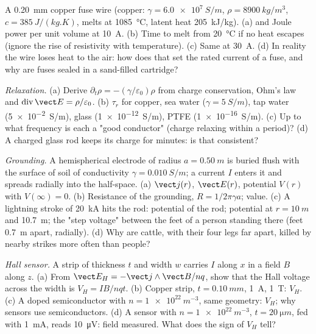 \begin{exercise}[$\star\star$]\label{exo:b2:charges-currents-conduction:8}
A \qty{0.20}{mm} copper fuse wire (copper: $\gamma = \qty{6.0e7}{S/m}$, $\rho =
\qty{8900}{kg/m^3}$, $c = \qty{385}{J/(kg.K)}$, melts at \qty{1085}{\degreeCelsius},
latent heat \qty{205}{kJ/kg}). (a)  and Joule power per
unit volume at \qty{10}{A}. (b) Time to melt from \qty{20}{\degreeCelsius} if no
heat escapes (ignore the rise of resistivity with temperature). (c)
Same at \qty{30}{A}. (d) In reality the wire loses heat to the air: how does
that set the rated current of a fuse, and why are fuses sealed in a
sand-filled cartridge?
\end{exercise}

\begin{exercise}[$\star\star$]\label{exo:b2:charges-currents-conduction:9}
\emph{Relaxation.} (a) Derive $\partial_t\rho = -(\gamma/\varepsilon_0)\rho$ from charge
conservation, Ohm's law and $\operatorname{div}\vect E = \rho/\varepsilon_0$. (b)
$\tau_r$ for copper, sea water ($\gamma = \qty{5}{S/m}$), tap water
(\qty{5e-2}{S/m}), glass (\qty{1e-12}{S/m}), PTFE (\qty{1e-16}{S/m}). (c)
Up to what frequency is each a "good conductor" (charge relaxing within
a period)? (d) A charged glass rod keeps its charge for minutes: is
that consistent?
\end{exercise}

\begin{exercise}[$\star\star\star$]\label{exo:b2:charges-currents-conduction:10}
\emph{Grounding.} A hemispherical electrode of radius $a = \qty{0.50}{m}$
is buried flush with the surface of soil of conductivity $\gamma =
\qty{0.010}{S/m}$; a current $I$ enters it and spreads radially into the
half-space. (a) $\vect j(r)$, $\vect E(r)$, potential $V(r)$ with $V(\infty) = 0$.
(b) Resistance of the grounding, $R = 1/2\pi\gamma a$; value. (c) A
lightning stroke of \qty{20}{kA} hits the rod: potential of the rod;
potential at $r = \qty{10}{m}$ and \qty{10.7}{m}; the "step voltage" between
the feet of a person standing there (feet \qty{0.7}{m} apart, radially).
(d) Why are cattle, with their four legs far apart, killed by nearby
strikes more often than people?
\end{exercise}

\begin{exercise}[$\star\star\star$]\label{exo:b2:charges-currents-conduction:11}
\emph{Hall sensor.} A strip of thickness $t$ and width $w$ carries $I$
along $x$ in a field $B$ along $z$. (a) From $\vect E_H = -\vect j\wedge\vect B
/nq$, show that the Hall voltage across the width is $V_H = IB/nqt$. (b)
Copper strip, $t = \qty{0.10}{mm}$, \qty{1}{A}, \qty{1}{T}: $V_H$. (c) A doped
semiconductor with $n = \qty{1e22}{m^{-3}}$, same geometry: $V_H$; why
sensors use semiconductors. (d) A sensor with $n = \qty{1e22}{m^{-3}}$, $t =
\qty{20}{\micro m}$, fed with \qty{1}{mA}, reads \qty{10}{\micro V}: field measured.
What does the sign of $V_H$ tell?
\end{exercise}

